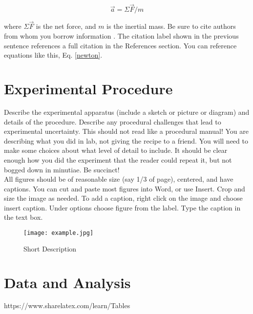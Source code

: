 \documentclass[11PT, a4paper]{article}
\begin{document}
\begin{equation}\label{newton}
\vec{a}=\Sigma\vec{F}/m
\end{equation}

where $\Sigma\vec{F}$ is the net force, and $m$ is the inertial mass. Be sure to cite authors from whom you
borrow information \cite{ReferenceLabel1}. The citation label shown in the previous sentence references a full
citation in the References section. You can reference equations like this, Eq. \ref{newton}.

\section{Experimental Procedure}
Describe the experimental apparatus (include a sketch or picture or diagram) and details of the procedure. Describe any procedural challenges that lead to experimental uncertainty. This should not read like a procedural manual! You are describing what you did in lab, not giving the recipe to a friend. You will need to make some choices about what level of detail to include. It should be clear enough how you did the experiment that the reader could repeat it, but not bogged down in minutiae. Be succinct!\\

All figures should be of reasonable size (say 1/3 of page), centered, and have captions. You can cut and paste most figures into Word, or use Insert. Crop and size the image as needed. To add a caption, right click on the image and choose insert caption. Under options choose figure from the label. Type the caption in the text box.

\begin{figure}[h!]
\centering
\texttt{[image: example.jpg]}
\caption{Short Description}
\label{fig:method}
\end{figure}

\section{Data and Analysis}

https://www.sharelatex.com/learn/Tables\\
\end{document}

